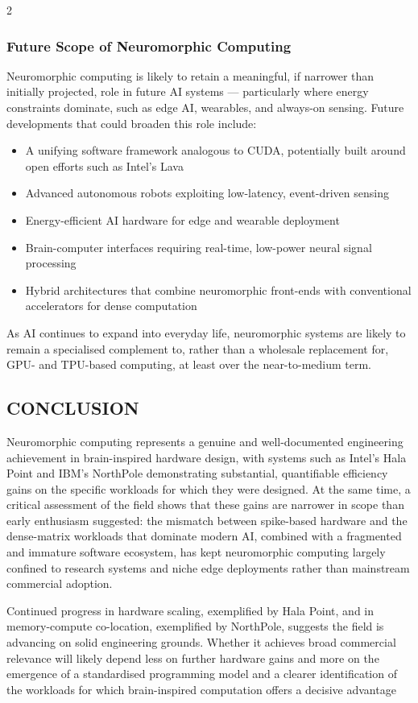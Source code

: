 \begin{multicols}{2}
  \subsubsection*{Future Scope of Neuromorphic Computing}
  Neuromorphic computing is likely to retain a meaningful, if narrower than initially projected, role in future AI systems — particularly where energy constraints dominate, such as edge AI, wearables, and always-on sensing.
  Future developments that could broaden this role include:
  \begin{itemize}\justifying
    \item A unifying software framework analogous to CUDA, potentially built around open efforts such as Intel's Lava
    \item Advanced autonomous robots exploiting low-latency, event-driven sensing
    \item Energy-efficient AI hardware for edge and wearable deployment
    \item Brain-computer interfaces requiring real-time, low-power neural signal processing
    \item Hybrid architectures that combine neuromorphic front-ends with conventional accelerators for dense computation
  \end{itemize}
  As AI continues to expand into everyday life, neuromorphic systems are likely to remain a specialised complement to, rather than a wholesale replacement for, GPU- and TPU-based computing, at least over the near-to-medium term.

  \subsection*{\centering\uppercase{Conclusion}}
  Neuromorphic computing represents a genuine and well-documented engineering achievement in brain-inspired hardware design, with systems such as Intel's Hala Point and IBM's NorthPole demonstrating substantial, quantifiable efficiency gains on the specific workloads for which they were designed. At the same time, a critical assessment of the field shows that these gains are narrower in scope than early enthusiasm suggested: the mismatch between spike-based hardware and the dense-matrix workloads that dominate modern AI, combined with a fragmented and immature software ecosystem, has kept neuromorphic computing largely confined to research systems and niche edge deployments rather than mainstream commercial adoption.

  \noindent
  Continued progress in hardware scaling, exemplified by Hala Point, and in memory-compute co-location, exemplified by NorthPole, suggests the field is advancing on solid engineering grounds. Whether it achieves broad commercial relevance will likely depend less on further hardware gains and more on the emergence of a standardised programming model and a clearer identification of the workloads for which brain-inspired computation offers a decisive advantage


\end{multicols}

